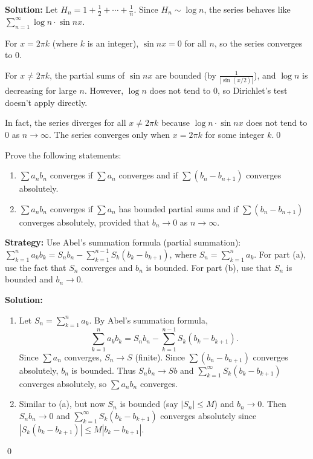 \bigskip\noindent\textbf{Solution:}
Let \(H_n = 1 + \frac{1}{2} + \cdots + \frac{1}{n}\). Since \(H_n \sim \log n\), the series behaves like \(\sum_{n=1}^{\infty} \log n \cdot \sin nx\).

For \(x = 2\pi k\) (where \(k\) is an integer), \(\sin nx = 0\) for all \(n\), so the series converges to 0.

For \(x \neq 2\pi k\), the partial sums of \(\sin nx\) are bounded (by \(\frac{1}{|\sin(x/2)|}\)), and \(\log n\) is decreasing for large \(n\). However, \(\log n\) does not tend to 0, so Dirichlet's test doesn't apply directly.

In fact, the series diverges for all \(x \neq 2\pi k\) because \(\log n \cdot \sin nx\) does not tend to 0 as \(n \to \infty\). The series converges only when \(x = 2\pi k\) for some integer \(k\).\qed



\begin{problembox}
\begin{problemstatement}
Prove the following statements:
\begin{enumerate}[label=\alph*)]
\item \(\sum a_n b_n\) converges if \(\sum a_n\) converges and if \(\sum (b_n - b_{n+1})\) converges absolutely.
\item \(\sum a_n b_n\) converges if \(\sum a_n\) has bounded partial sums and if \(\sum (b_n - b_{n+1})\) converges absolutely, provided that \(b_n \to 0\) as \(n \to \infty\).
\end{enumerate}
\end{problemstatement}
\end{problembox}

\noindent\textbf{Strategy:} Use Abel's summation formula (partial summation): \(\sum_{k=1}^n a_k b_k = S_n b_n - \sum_{k=1}^{n-1} S_k(b_k - b_{k+1})\), where \(S_n = \sum_{k=1}^n a_k\). For part (a), use the fact that \(S_n\) converges and \(b_n\) is bounded. For part (b), use that \(S_n\) is bounded and \(b_n \to 0\).

\bigskip\noindent\textbf{Solution:}
\begin{enumerate}[label=(\alph*)]
\item Let \(S_n = \sum_{k=1}^n a_k\). By Abel's summation formula,
\[\sum_{k=1}^n a_k b_k = S_n b_n - \sum_{k=1}^{n-1} S_k(b_k - b_{k+1}).\]
Since \(\sum a_n\) converges, \(S_n \to S\) (finite). Since \(\sum (b_n - b_{n+1})\) converges absolutely, \(b_n\) is bounded. Thus \(S_n b_n \to S b\) and \(\sum_{k=1}^{\infty} S_k(b_k - b_{k+1})\) converges absolutely, so \(\sum a_n b_n\) converges.

\item Similar to (a), but now \(S_n\) is bounded (say \(|S_n| \leq M\)) and \(b_n \to 0\). Then \(S_n b_n \to 0\) and \(\sum_{k=1}^{\infty} S_k(b_k - b_{k+1})\) converges absolutely since \(|S_k(b_k - b_{k+1})| \leq M|b_k - b_{k+1}|\).
\end{enumerate}\qed

